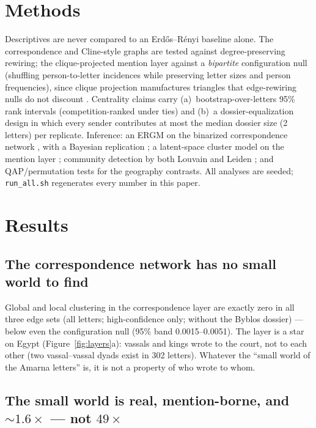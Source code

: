 \documentclass[11pt]{article}
\newcommand{\project}[1]{\texttt{#1}}
\begin{document}
\section{Methods}

Descriptives are never compared to an Erdős--Rényi baseline alone. The
correspondence and Cline-style graphs are tested against
degree-preserving rewiring; the clique-projected mention layer against a
\emph{bipartite} configuration null (shuffling person-to-letter
incidences while preserving letter sizes and person frequencies), since
clique projection manufactures triangles that edge-rewiring nulls do not
discount \citep{BrughmansPeeples2023}. Centrality claims carry
(a)~bootstrap-over-letters 95\% rank intervals (competition-ranked under
ties) and (b)~a dossier-equalization design in which every sender
contributes at most the median dossier size (2 letters) per replicate.
Inference: an ERGM on the binarized correspondence network
\citep{HunterHandcock2006, Handcock2008statnet}, with a Bayesian
replication \citep{CaimoFriel2011}; a latent-space cluster model on the
mention layer \citep{KrivitskyHandcock2008}; community detection by both
Louvain and Leiden \citep{Blondel2008, Traag2019}; and QAP/permutation
tests \citep{FreedmanLane1983} for the geography contrasts. All analyses
are seeded; \project{run\_all.sh} regenerates every number in this
paper.

\section{Results}

\subsection{The correspondence network has no small world to find}

Global and local clustering in the correspondence layer are exactly zero
in all three edge sets (all letters; high-confidence only; without the
Byblos dossier) --- below even the configuration null (95\% band
0.0015--0.0051). The layer is a star on Egypt
(Figure~\ref{fig:layers}a): vassals and kings wrote to the court, not to
each other (two vassal--vassal dyads exist in 302 letters). Whatever the
``small world of the Amarna letters'' is, it is not a property of who
wrote to whom.

\subsection{The small world is real, mention-borne, and
${\sim}1.6\times$ --- not $49\times$}
\end{document}
